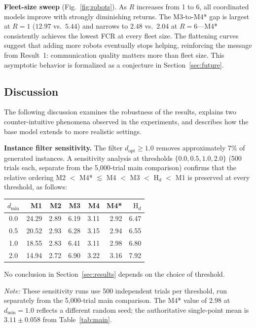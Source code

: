 \documentclass[conference]{IEEEtran}
\begin{document}
\textbf{Fleet-size sweep} (Fig.~\ref{fig:robots}).
As $R$ increases from 1 to 6, all coordinated models improve with strongly
diminishing returns.
The M3-to-M4* gap is largest at $R{=}1$ ($12.97$ vs.\ $5.44$) and narrows
to $2.48$ vs.\ $2.04$ at $R{=}6$---M4* consistently achieves the lowest FCR
at every fleet size.
The flattening curves suggest that adding more robots eventually stops
helping, reinforcing the message from Result~1: communication quality
matters more than fleet size.
This asymptotic behavior is formalized as a conjecture in
Section~\ref{sec:future}.

\subsection{Discussion}\label{sec:discussion}

The following discussion examines the robustness of the results, explains
two counter-intuitive phenomena observed in the experiments, and describes
how the base model extends to more realistic settings.

\textbf{Instance filter sensitivity.}
The filter $d_{\mathrm{opt}} \geq 1.0$ removes approximately $7\%$ of
generated instances.
A sensitivity analysis at thresholds $\{0.0, 0.5, 1.0, 2.0\}$ (500 trials
each, separate from the 5,000-trial main comparison) confirms that the
relative ordering M2 $<$ M4* $\lesssim$ M4 $<$ M3 $<$ $\mathrm{H}_d$ $<$ M1
is preserved at every threshold, as follows:

\begin{center}
\footnotesize
\begin{tabular}{@{}crrrrrr@{}}
\toprule
$d_{\min}$ & M1 & M2 & M3 & M4 & M4* & $\mathrm{H}_d$ \\
\midrule
0.0 & 24.29 & 2.89 & 6.19 & 3.11 & 2.92 & 6.47 \\
0.5 & 20.52 & 2.93 & 6.28 & 3.15 & 2.94 & 6.55 \\
1.0 & 18.55 & 2.83 & 6.41 & 3.11 & 2.98 & 6.80 \\
2.0 & 14.94 & 2.72 & 6.90 & 3.22 & 3.16 & 7.92 \\
\bottomrule
\end{tabular}
\end{center}

No conclusion in Section~\ref{sec:results} depends on the choice of threshold.

\smallskip
{\footnotesize \textit{Note:} These sensitivity runs use 500 independent trials per threshold, run separately from the 5{,}000-trial main comparison. The M4* value of $2.98$ at $d_{\min}{=}1.0$ reflects a different random seed; the authoritative single-point mean is $3.11 \pm 0.058$ from Table~\ref{tab:main}.}
\end{document}

